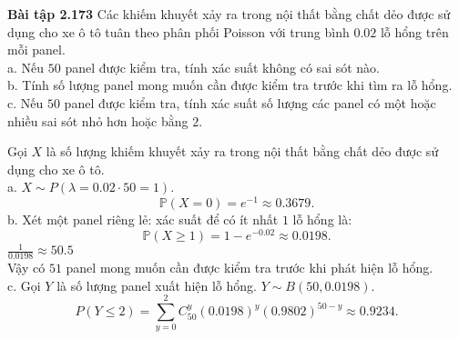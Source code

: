 \documentclass[12pt,a4paper]{article}
\begin{document}
\begin{mybox}
\textbf{Bài tập 2.173} Các khiếm khuyết xảy ra trong nội thất bằng chất dẻo được sử dụng cho xe ô tô tuân theo phân phối Poisson với trung bình $0.02$ lỗ hổng trên mỗi panel.\\
a. Nếu $50$ panel được kiểm tra, tính xác suất không có sai sót nào.\\
b. Tính số lượng panel mong muốn cần được kiểm tra trước khi tìm ra lỗ hổng.\\
c. Nếu $50$ panel được kiểm tra, tính xác suất số lượng các panel có một hoặc nhiều sai sót nhỏ hơn hoặc bằng $2.$
\end{mybox}
Gọi $X$ là số lượng khiếm khuyết xảy ra trong nội thất bằng chất dẻo được sử dụng cho xe ô tô.\\
a. $X \sim P \left( {\lambda = 0.02 \cdot 50 = 1} \right).$
$$\mathbb{P} \left( {X = 0} \right) = e^{-1} \approx 0.3679.$$
b. Xét một panel riêng lẻ: xác suất để có ít nhất $1$ lỗ hổng là:
$$\mathbb{P} \left( {X \geqslant 1} \right) = 1 - e^{-0.02} \approx 0.0198.$$
$\frac{1}{0.0198} \approx 50.5$\\
Vậy có $51$ panel mong muốn cần được kiểm tra trước khi phát hiện lỗ hổng.\\
c. Gọi $Y$ là số lượng panel xuất hiện lỗ hổng. $Y \sim B \left( {50, 0.0198} \right).$
$$P \left( {Y \leqslant 2} \right) = \sum\limits_{y = 0}^{2}{C^y_{50} \left( {0.0198} \right)^{y} \left( {0.9802} \right)^{50 - y}} \approx 0.9234.$$
\end{document}
